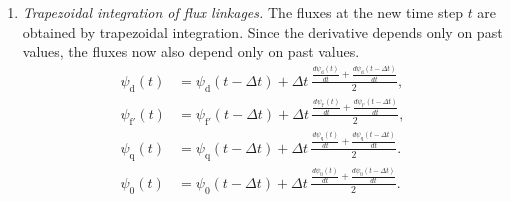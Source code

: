 \begin{enumerate}
    The field voltage equation remains:
    \begin{equation}
    v_{\text{f}'} = R_{\text{f}'} i_{\text{f}'} + \frac{d\psi_{\text{f}'}}{dt}.
    \end{equation}

    Thus, the flux derivatives evaluated at time $t$ using information at time $t-\Delta t$ are:
    \begin{equation}
    \begin{aligned}
    \frac{d\psi_\text{d}}{dt}(t) &= v_\text{d}(t-\Delta t) - R_\text{a} i_\text{d}(t-\Delta t) - \omega(t-\Delta t)\psi_\text{q}(t-\Delta t), \\[4pt]
    \frac{d\psi_\text{q}}{dt}(t) &= v_\text{q}(t-\Delta t) - R_\text{a} i_\text{q}(t-\Delta t) + \omega(t-\Delta t)\psi_\text{d}(t-\Delta t), \\[4pt]
    \frac{d\psi_\text{0}}{dt}(t) &= v_\text{0}(t-\Delta t) - R_\text{a} i_\text{0}(t-\Delta t), \\[4pt]
    \frac{d\psi_{\text{f}'}}{dt}(t) &= v_{\text{f}'}(t-\Delta t) - R_{\text{f}'} i_{\text{f}'}(t-\Delta t).
    \end{aligned}
    \label{eq:dq0_flux_derivatives}
    \end{equation}

    \item \textit{Trapezoidal integration of flux linkages.}  
    The fluxes at the new time step $t$ are obtained by trapezoidal integration. Since the derivative depends only on past values,
    the fluxes now also depend only on past values.
    \begin{equation}
        \begin{aligned}
            \psi_\text{d}(t) &= \psi_\text{d}(t-\Delta t) + \Delta t \, \frac{\tfrac{d \psi_\text{d}(t)}{d t} + \tfrac{d \psi_\text{d}(t-\Delta t)}{d t}}{2}, \\
            \psi_{\text{f}'}(t) &= \psi_{\text{f}'}(t-\Delta t) + \Delta t \, \frac{\tfrac{d \psi_{\text{f}'}(t)}{d t} + \tfrac{d \psi_{\text{f}'}(t-\Delta t)}{d t}}{2}, \\
            \psi_\text{q}(t) &= \psi_\text{q}(t-\Delta t) + \Delta t \, \frac{\tfrac{d \psi_\text{q}(t)}{d t} + \tfrac{d \psi_\text{q}(t-\Delta t)}{d t}}{2}. \\
            \psi_\text{0}(t) &= \psi_\text{0}(t-\Delta t) + \Delta t \, \frac{\tfrac{d \psi_\text{0}(t)}{d t} + \tfrac{d \psi_\text{0}(t-\Delta t)}{d t}}{2}.
        \end{aligned}
    \end{equation}


\end{enumerate}
